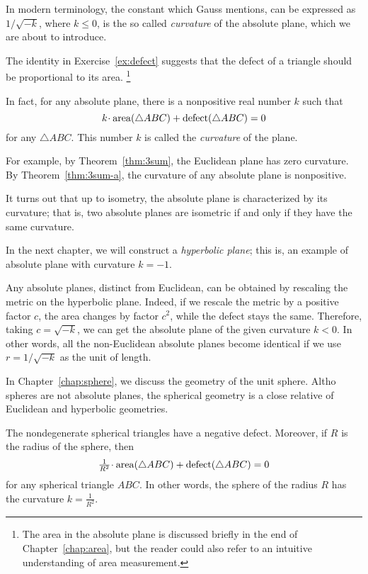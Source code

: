 In modern terminology, the constant which Gauss mentions, 
can be expressed as $1/\sqrt{-k}$, 
where $k\le 0$, is the so called \emph{curvature} of the absolute plane, which we are about to introduce.

The identity in Exercise~\ref{ex:defect} suggests that the defect of a triangle should be proportional to its area.%
\footnote{The area in the absolute plane is discussed briefly in the end of Chapter~\ref{chap:area},
but the reader could also refer to an intuitive understanding of area measurement.}

In fact, for any absolute plane, there is a nonpositive real number $k$
such that 
$$k\cdot\area(\triangle ABC)+\defect(\triangle ABC)=0$$
for any $\triangle ABC$.
This number $k$ is called the \emph{curvature} of the plane.

For example, by Theorem~\ref{thm:3sum}, the Euclidean plane has zero curvature.
By Theorem~\ref{thm:3sum-a}, the curvature of any absolute plane is nonpositive.

It turns out that up to isometry, the absolute plane is characterized by its curvature;
that is, two absolute planes are isometric if and only if they have the same curvature. 

In the next chapter, we will construct a \emph{hyperbolic plane};
this is, an example of absolute plane with curvature $k=-1$.

Any absolute planes, distinct from Euclidean,
can be obtained by rescaling the metric on the hyperbolic plane.
Indeed,
if we rescale the metric by a positive factor $c$,
the area changes by factor $c^2$, while the defect stays the same.
Therefore, taking $c=\sqrt{-k}$,
we can get the absolute plane of the given curvature $k<0$.
In other words, all the non-Euclidean absolute planes become identical
if we use $r=1/\sqrt{-k}$ as the unit of length.

\medskip

In Chapter~\ref{chap:sphere},
we discuss the geometry of the unit sphere.
Altho spheres are not absolute planes,
the spherical geometry is a close relative of Euclidean and hyperbolic geometries.

The nondegenerate spherical triangles have a negative defect.
Moreover, 
if $R$ is the radius of the sphere, then
$$\tfrac1{R^2}\cdot\area(\triangle ABC)+\defect(\triangle ABC)=0$$
for any spherical triangle $ABC$.
In other words, 
the sphere of the radius $R$ has the curvature $k=\tfrac1{R^2}$.


